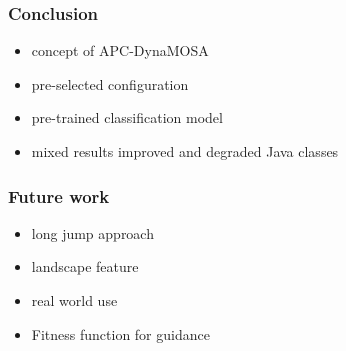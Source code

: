 
\begin{frame}
	\frametitle{Conclusion}

	\begin{itemize}
		\item concept of APC-DynaMOSA
		\item pre-selected configuration
		\item pre-trained classification model
		\item mixed results improved and degraded Java classes
	\end{itemize}
	
\end{frame}

\begin{frame}
	\frametitle{Future work}

	\begin{itemize}
		\item long jump approach
		\item landscape feature
		\item real world use
		\item Fitness function for guidance
	\end{itemize}
	
\end{frame}